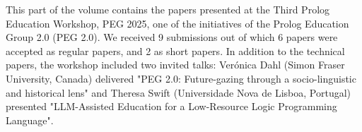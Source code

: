 \documentclass[
]{ceurart}
\begin{document}




\noindent
This part of the volume contains the papers presented at the Third Prolog Education Workshop, PEG 2025, one of the initiatives of the Prolog Education Group 2.0 (PEG 2.0). We received 9 submissions out of which 6 papers were accepted as regular papers, and 2 as short papers. In addition to the technical papers, the workshop included two invited talks: Verónica Dahl (Simon Fraser University, Canada) delivered "PEG 2.0: Future-gazing through a socio-linguistic and historical lens" and Theresa Swift (Universidade Nova de Lisboa, Portugal) presented "LLM-Assisted Education for a Low-Resource Logic Programming Language".
\end{document}
